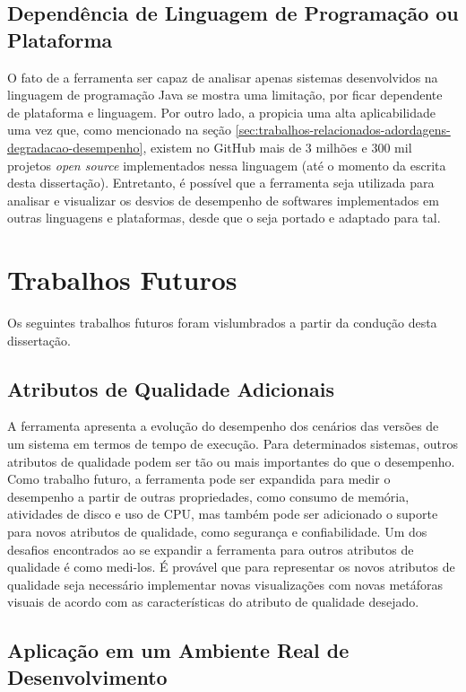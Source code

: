 \subsection{Dependência de Linguagem de Programação ou Plataforma}

O fato de a ferramenta ser capaz de analisar apenas sistemas desenvolvidos na linguagem de programação Java se mostra uma limitação, por ficar dependente de plataforma e linguagem. Por outro lado, a propicia uma alta aplicabilidade uma vez que, como mencionado na seção \ref{sec:trabalhos-relacionados-adordagens-degradacao-desempenho}, existem no GitHub mais de 3 milhões e 300 mil projetos \textit{open source} implementados nessa linguagem (até o momento da escrita desta dissertação). Entretanto, é possível que a ferramenta seja utilizada para analisar e visualizar os desvios de desempenho de softwares implementados em outras linguagens e plataformas, desde que o {\textit{\perfMinerName}} seja portado e adaptado para tal.

\section{Trabalhos Futuros} \label{sec:consideracoes-trabalhos-futuros}

Os seguintes trabalhos futuros foram vislumbrados a partir da condução desta dissertação.

\subsection{Atributos de Qualidade Adicionais}

A ferramenta apresenta a evolução do desempenho dos cenários das versões de um sistema em termos de tempo de execução. Para determinados sistemas, outros atributos de qualidade podem ser tão ou mais importantes do que o desempenho. Como trabalho futuro, a ferramenta pode ser expandida para medir o desempenho a partir de outras propriedades, como consumo de memória, atividades de disco e uso de CPU, mas também pode ser adicionado o suporte para novos atributos de qualidade, como segurança e confiabilidade. Um dos desafios encontrados ao se expandir a ferramenta para outros atributos de qualidade é como medi-los. É provável que para representar os novos atributos de qualidade seja necessário implementar novas visualizações com novas metáforas visuais de acordo com as características do atributo de qualidade desejado.

\subsection{Aplicação em um Ambiente Real de Desenvolvimento}

